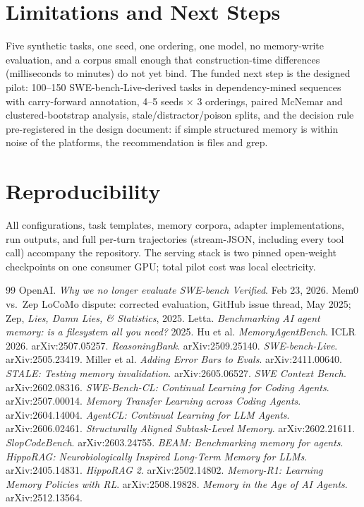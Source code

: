 \documentclass[11pt]{article}
\begin{document}
\section{Limitations and Next Steps}
Five synthetic tasks, one seed, one ordering, one model, no memory-write evaluation, and a corpus small enough that construction-time differences (milliseconds to minutes) do not yet bind. The funded next step is the designed pilot: 100--150 SWE-bench-Live-derived tasks in dependency-mined sequences with carry-forward annotation, 4--5 seeds $\times$ 3 orderings, paired McNemar and clustered-bootstrap analysis, stale/distractor/poison splits, and the decision rule pre-registered in the design document: if simple structured memory is within noise of the platforms, the recommendation is files and grep.

\section*{Reproducibility}
All configurations, task templates, memory corpora, adapter implementations, run outputs, and full per-turn trajectories (stream-JSON, including every tool call) accompany the repository. The serving stack is two pinned open-weight checkpoints on one consumer GPU; total pilot cost was local electricity.

\begin{thebibliography}{99}
 OpenAI. \emph{Why we no longer evaluate SWE-bench Verified}. Feb 23, 2026.
 Mem0 vs.\ Zep LoCoMo dispute: corrected evaluation, GitHub issue thread, May 2025; Zep, \emph{Lies, Damn Lies, \& Statistics}, 2025.
 Letta. \emph{Benchmarking AI agent memory: is a filesystem all you need?} 2025.
 Hu et al. \emph{MemoryAgentBench}. ICLR 2026. arXiv:2507.05257.
 \emph{ReasoningBank}. arXiv:2509.25140.
 \emph{SWE-bench-Live}. arXiv:2505.23419.
 Miller et al. \emph{Adding Error Bars to Evals}. arXiv:2411.00640.
 \emph{STALE: Testing memory invalidation}. arXiv:2605.06527.
 \emph{SWE Context Bench}. arXiv:2602.08316.
 \emph{SWE-Bench-CL: Continual Learning for Coding Agents}. arXiv:2507.00014.
 \emph{Memory Transfer Learning across Coding Agents}. arXiv:2604.14004.
 \emph{AgentCL: Continual Learning for LLM Agents}. arXiv:2606.02461.
 \emph{Structurally Aligned Subtask-Level Memory}. arXiv:2602.21611.
 \emph{SlopCodeBench}. arXiv:2603.24755.
 \emph{BEAM: Benchmarking memory for agents}.
 \emph{HippoRAG: Neurobiologically Inspired Long-Term Memory for LLMs}. arXiv:2405.14831.
 \emph{HippoRAG 2}. arXiv:2502.14802.
 \emph{Memory-R1: Learning Memory Policies with RL}. arXiv:2508.19828.
 \emph{Memory in the Age of AI Agents}. arXiv:2512.13564.
\end{thebibliography}
\end{document}
